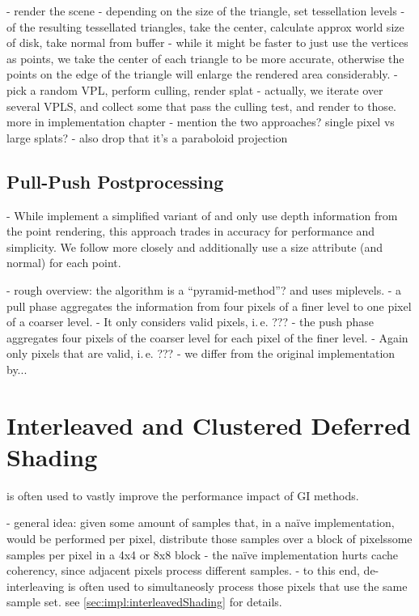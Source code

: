 - render the scene
- depending on the size of the triangle, set tessellation levels
- of the resulting tessellated triangles, take the center, calculate approx world size of disk, take normal from buffer
- while it might be faster to just use the vertices as points, we take the center of each triangle to be more accurate, otherwise the points on the edge of the triangle will enlarge the rendered area considerably.
- pick a random VPL, perform culling, render splat
- actually, we iterate over several VPLS, and collect some that pass the culling test, and render to those. more in implementation chapter
- mention the two approaches? single pixel vs large splats?
- also drop that it's a paraboloid projection

\subsection{Pull-Push Postprocessing}

- While \citep{ritschel2008ism} implement a simplified variant of \citet{Marroquim:2007:reconstruction} and only use depth information from the point rendering, this approach trades in accuracy for performance and simplicity. We follow \citet{Marroquim:2007:reconstruction} more closely and additionally use a size attribute (and normal) for each point.

- rough overview: the algorithm is a ``pyramid-method''? and uses miplevels.
- a pull phase aggregates the information from four pixels of a finer level to one pixel of a coarser level.
- It only considers valid pixels, i.\,e. ???
- the push phase aggregates four pixels of the coarser level for each pixel of the finer level.
- Again only pixels that are valid, i.\,e. ???
- we differ from the original implementation by...



\section{Interleaved and Clustered Deferred Shading}
\label{sec:interleavedAndClusteredShading}
\citep{Keller:2001:InterleavedSampling} is often used to vastly improve the performance impact of GI methods.

- general idea: given some amount of samples that, in a naïve implementation, would be performed per pixel, distribute those samples over a block of pixelssome samples per pixel in a 4x4 or 8x8 block
- the naïve implementation hurts cache coherency, since adjacent pixels process different samples.
- to this end, de-interleaving is often used to simultaneosly process those pixels that use the same sample set. see \ref{sec:impl:interleavedShading} for details.


